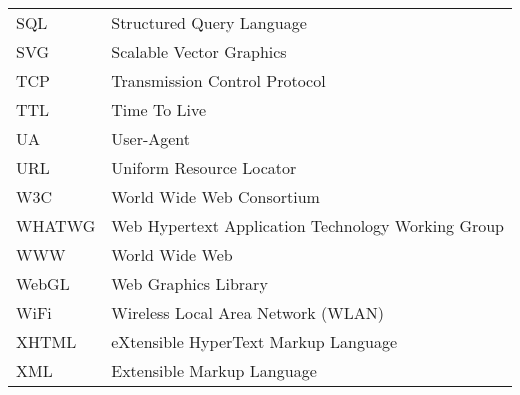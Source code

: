 \begin{longtable}{@{}p{}p{}@{}}
SQL & Structured Query Language\\
SVG & Scalable Vector Graphics\\
TCP & Transmission Control Protocol\\
TTL & Time To Live\\
UA & User-Agent\\
URL & Uniform Resource Locator\\
W3C & World Wide Web Consortium\\
WHATWG & Web Hypertext Application Technology Working Group\\
WWW &  World Wide Web\\
WebGL & Web Graphics Library\\
WiFi & Wireless Local Area Network (WLAN)\\
XHTML & eXtensible HyperText Markup Language\\
XML & Extensible Markup Language\\

\end{longtable}
